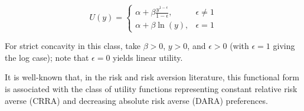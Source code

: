 \documentclass[../../../00-main.tex]{subfiles}
\begin{document}
\begin{equation}
U(y) = 
	\begin{cases}
	\alpha + \beta \frac{y^{1-\epsilon}}{1-\epsilon}, & \epsilon \neq 1\\
	\alpha + \beta \ln(y), & \epsilon =1
	\end{cases}
\end{equation}

\par For strict concavity in this class, take $\beta>0$, $y>0$, and $\epsilon>0$ (with $\epsilon=1$ giving the log case); note that $\epsilon=0$ yields linear utility.

\par It is well-known that, in the risk and risk aversion literature, this functional form is associated with the class of utility functions representing constant relative risk averse (CRRA) and decreasing absolute risk averse (DARA) preferences.
\end{document}

